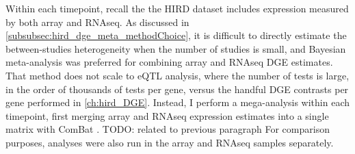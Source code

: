 
%
%
%
%
Within each timepoint, recall the the \gls{HIRD} dataset includes expression measured by both array and \gls{RNAseq}.
As discussed in \cref{subsubsec:hird_dge_meta_methodChoice}, it is difficult to directly estimate the between-studies heterogeneity when the number of studies is small, 
and Bayesian meta-analysis was preferred for combining array and \gls{RNAseq} \gls{DGE} estimates.
That method does not scale to \gls{eQTL} analysis, where the number of tests is large, in the order of thousands of tests per gene, versus the handful \gls{DGE} contrasts per gene performed in \cref{ch:hird_DGE}.
Instead, I perform a mega-analysis within each timepoint, first merging array and \gls{RNAseq} expression estimates into a single matrix with ComBat \autocite{johnson2007AdjustingBatchEffects}.
TODO: related to previous paragraph
For comparison purposes, analyses were also run in the array and \gls{RNAseq} samples separately.

